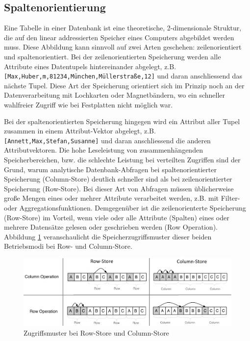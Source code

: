 \subsection{Spaltenorientierung}

Eine Tabelle in einer Datenbank ist eine theoretische, 2-dimensionale Struktur,
die auf den linear addressierten Speicher eines Computers abgebildet werden muss. Diese
Abbildung kann sinnvoll auf zwei Arten geschehen: zeilenorientiert und spaltenorientiert.
Bei der zeilenorientierten Speicherung werden alle Attribute eines Datentupels hintereinander abgelegt, z.B.
\texttt{[Max,Huber,m,81234,München,Müllerstraße,12]} und daran anschliessend das nächste Tupel.
Diese Art der Speicherung orientiert sich im Prinzip noch an der Datenverarbeitung mit Lochkarten oder Magnetbändern,
wo ein schneller wahlfreier Zugriff wie bei Festplatten nicht möglich war.

Bei der spaltenorientierten Speicherung hingegen wird ein Attribut aller Tupel zusammen in einem Attribut-Vektor abgelegt, z.B.
\texttt{[Annett,Max,Stefan,Susanne]} und daran anschliessend die anderen Attributvektoren.
Die hohe Leseleistung von zusammenhängenden Speicherbereichen, bzw. die schlechte
Leistung bei verteilten Zugriffen sind der Grund, warum analytische Datenbank-Abfragen bei 
spaltenorientierter Speicherung (Column-Store) deutlich schneller sind als bei zeilenorientierter Speicherung
(Row-Store). Bei dieser Art von Abfragen müssen üblicherweise große Mengen eines
oder mehrer Attribute verarbeitet werden, z.B. mit Filter- oder Aggregationsfunktionen.
Demgegenüber ist die zeilenorienterte Speicherung (Row-Store) im Vorteil, wenn viele oder alle Attribute 
(Spalten) eines oder mehrere Datensätze gelesen oder geschrieben werden (Row Operation).
Abbildung \ref{rscs} veranschaulicht die Speicherzugriffsmuster dieser beiden Betriebsmodi
bei Row- und Column-Store.

\begin{figure}[h]
\centering
\includegraphics[width=.9\textwidth]{img/rs-cs2.png}
\caption[Zugriffsmuster bei Row-Store und Column-Store]{Zugriffsmuster bei Row-Store und Column-Store\footnotemark}
\label{rscs}
\end{figure}


